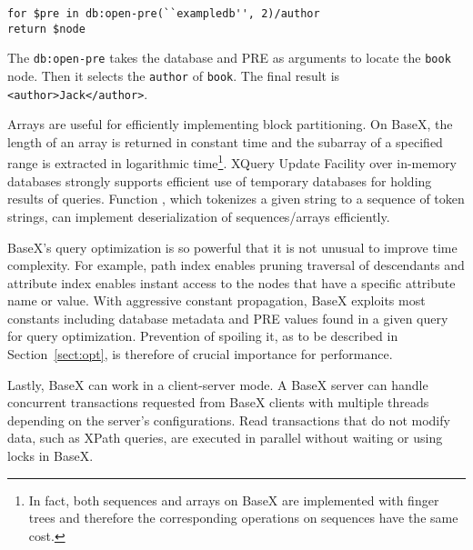 \begin{lstlisting}
for $pre in db:open-pre(``exampledb'', 2)/author
return $node
\end{lstlisting}

The \texttt{db:open-pre} takes the database and PRE as arguments to locate the
\texttt{book} node. Then it selects the \texttt{author} of \texttt{book}. The final
result is \verb|<author>Jack</author>|.


Arrays are useful for efficiently implementing block partitioning. On BaseX, the
length of an array is returned in constant time and the subarray of a specified
range is extracted in logarithmic time\footnote{In fact, both sequences and
arrays on BaseX are implemented with finger trees and therefore the
corresponding operations on sequences have the same cost.}. XQuery Update
Facility over in-memory databases strongly supports efficient use of temporary
databases for holding results of queries. Function , which
tokenizes a given string to a sequence of token strings, can implement
deserialization of sequences/arrays efficiently.  

BaseX's query optimization is so powerful that it is not unusual to improve time
complexity. For example, path index enables pruning
traversal of descendants and attribute index enables instant access to
the nodes that have a specific attribute name or value. With aggressive constant
propagation, BaseX exploits most constants including database metadata and PRE
values found in a given query for query optimization. Prevention of spoiling it,
as to be described in Section~\ref{sect:opt}, is therefore of crucial importance
for performance.

Lastly, BaseX can work in a client-server mode. A BaseX server can handle
concurrent transactions requested from BaseX clients with multiple threads
depending on the server's configurations. Read transactions that do not modify
data, such as XPath queries, are executed in parallel without waiting or using
locks in BaseX.
